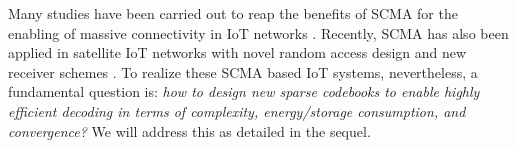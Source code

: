 \documentclass[journal]{IEEEtran}
\begin{document}
  Many studies have been carried out  to reap the benefits of SCMA for the enabling of massive connectivity in  IoT networks  \cite{AchievingZeng,SparseMoon,JointMiuccio,AnalyzingLai,ZhangComplexity,WangIterative}.  Recently, SCMA has also been applied in satellite IoT networks with novel  random access design \cite{ZhangUser,li2019asynchronous} and new receiver schemes  \cite{ZhangComplexity,WangIterative}. To realize these SCMA based IoT systems, nevertheless, a fundamental question is: \textit{how to design new sparse codebooks to enable highly efficient decoding in terms of complexity, energy/storage consumption, and convergence?} We will address this as detailed in the sequel. 
 
 

 
 
 
\end{document}

